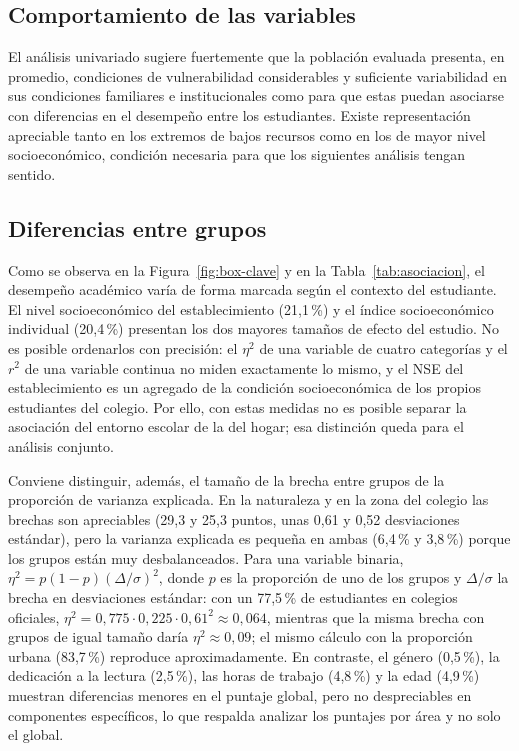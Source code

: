 \documentclass[12pt]{article}
\begin{document}
\subsection{Comportamiento de las variables}
 
El análisis univariado sugiere fuertemente que la población evaluada presenta, en promedio, condiciones
de vulnerabilidad considerables y suficiente variabilidad en sus condiciones familiares e institucionales
como para que estas puedan asociarse con diferencias en el desempeño entre los estudiantes. Existe representación
apreciable tanto en los extremos de bajos recursos como en los de mayor nivel socioeconómico, condición necesaria
para que los siguientes análisis tengan sentido.
 
\subsection{Diferencias entre grupos}
 
Como se observa en la Figura~\ref{fig:box-clave} y en la Tabla~\ref{tab:asociacion}, el
desempeño académico varía de forma marcada según el contexto del estudiante. El nivel
socioeconómico del establecimiento (21{,}1\,\%) y el índice socioeconómico individual
(20{,}4\,\%) presentan los dos mayores tamaños de efecto del estudio. No es posible
ordenarlos con precisión: el $\eta^2$ de una variable de cuatro categorías y el $r^2$ de una
variable continua no miden exactamente lo mismo, y el NSE del establecimiento es un agregado
de la condición socioeconómica de los propios estudiantes del colegio. Por ello, con estas
medidas no es posible separar la asociación del entorno escolar de la del hogar; esa
distinción queda para el análisis conjunto.

Conviene distinguir, además, el tamaño de la brecha entre grupos de la proporción de varianza
explicada. En la naturaleza y en la zona del colegio las brechas son apreciables (29{,}3 y
25{,}3 puntos, unas 0{,}61 y 0{,}52 desviaciones estándar), pero la varianza explicada es
pequeña en ambas (6{,}4\,\% y 3{,}8\,\%) porque los grupos están muy desbalanceados. Para
una variable binaria, ${\eta^2 = p(1-p)(\Delta/\sigma)^2}$, donde $p$ es la proporción de uno de
los grupos y $\Delta/\sigma$ la brecha en desviaciones estándar: con un 77{,}5\,\% de
estudiantes en colegios oficiales, $\eta^2 = 0{,}775 \cdot 0{,}225 \cdot 0{,}61^2 \approx
0{,}064$, mientras que la misma brecha con grupos de igual tamaño daría $\eta^2 \approx
0{,}09$; el mismo cálculo con la proporción urbana (83{,}7\,\%) reproduce aproximadamente.
En contraste, el género (0{,}5\,\%), la dedicación a la lectura (2{,}5\,\%), las horas de
trabajo (4{,}8\,\%) y la edad (4{,}9\,\%) muestran diferencias menores en el puntaje global,
pero no despreciables en componentes específicos, lo que respalda analizar los puntajes por
área y no solo el global.
 
\end{document}
